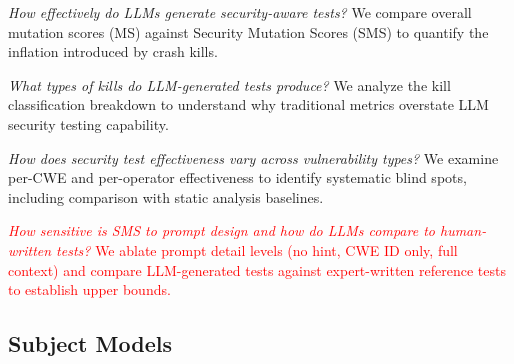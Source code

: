 \documentclass[sigconf,anonymous,review]{acmart}
\begin{document}
\begin{description}
    \item[RQ1:] \textit{How effectively do LLMs generate security-aware tests?} We compare overall mutation scores (MS) against Security Mutation Scores (SMS) to quantify the inflation introduced by  crash kills.

    \item[RQ2:] \textit{What types of kills do LLM-generated tests produce?} We analyze the kill classification breakdown to understand why traditional metrics overstate LLM security testing capability.

    \item[RQ3:] \textit{How does security test effectiveness vary across vulnerability types?} We examine per-CWE and per-operator effectiveness to identify systematic blind spots, including comparison with static analysis baselines.

\textcolor{red}{
    \item[RQ4:] \textit{How sensitive is SMS to prompt design and how do LLMs compare to human-written tests?} We ablate prompt detail levels (no hint, CWE ID only, full context) and compare LLM-generated tests against expert-written reference tests to establish upper bounds. }

\end{description}


\subsection{Subject Models}

\end{document}
